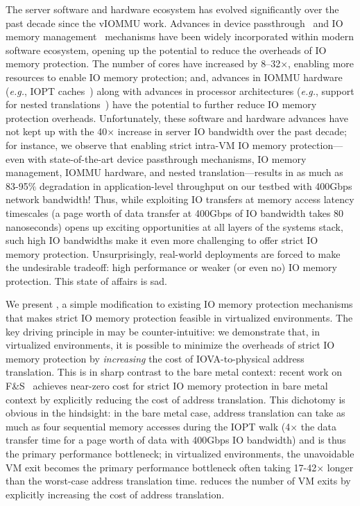 The server software and hardware ecosystem has evolved significantly over the past decade since the vIOMMU work. 
Advances in device passthrough~\cite{intel_vtd_spec, amd_iommu_spec, arm_smmu_spec, Wang2025ToPRI, Guo2024VPRI} 
    and IO memory management~\cite{markuze2018damn} mechanisms have been widely incorporated within modern software ecosystem, 
    opening up the potential to reduce the overheads of IO memory protection. 
The number of cores have increased by 8--32$\times$, 
    enabling more resources to enable IO memory protection; 
    and, advances in IOMMU hardware (\textit{e.g.}, IOPT caches~\cite{Rubin2024FastSafe}) 
    along with advances in processor architectures (\textit{e.g.}, 
    support for nested translations~\cite{intel_vtd_spec}) have the potential to further reduce IO memory protection overheads. 
Unfortunately, these software and hardware advances have not kept up with the 40$\times$ 
    increase in server IO bandwidth over the past decade; 
    for instance, we observe that enabling strict intra-VM IO memory protection---even with state-of-the-art device passthrough 
    mechanisms, IO memory management, IOMMU hardware, and nested translation---results in 
    as much as 83-95$\%$ degradation in application-level throughput 
    on our testbed with 400Gbps network bandwidth! 
Thus, while exploiting IO transfers at memory access latency timescales 
    (a page worth of data transfer at 400Gbps of IO bandwidth takes 80 nanoseconds) 
    opens up exciting opportunities at all layers of the systems stack, 
    such high IO bandwidths make it even more challenging to offer strict IO memory protection. 
Unsurprisingly, real-world deployments are forced to make the undesirable tradeoff: 
    high performance or weaker (or even no) IO memory protection. This state of affairs is sad. 

We present {\name}, a simple modification to existing IO memory protection mechanisms 
    that makes strict IO memory protection feasible in virtualized environments. 
The key driving principle in {\name} may be counter-intuitive: 
    we demonstrate that, in virtualized environments, it is possible to minimize the overheads 
    of strict IO memory protection by \textit{increasing} the cost of IOVA-to-physical address translation. 
    This is in sharp contrast to the bare metal context: recent work on F\&S~\cite{Rubin2024FastSafe} 
    achieves near-zero cost for strict IO memory protection in bare metal context by explicitly 
    reducing the cost of address translation. 
This dichotomy is obvious in the hindsight: in the bare metal case, address translation 
    can take as much as four sequential memory accesses during the IOPT walk (4$\times$ the data transfer 
    time for a page worth of data with 400Gbps IO bandwidth) 
    and is thus the primary performance bottleneck; in virtualized environments, 
    the unavoidable VM exit becomes the primary performance bottleneck often taking 17-42$\times$ 
    longer than the worst-case address translation time. 
{\name} reduces the number of VM exits by explicitly increasing the cost of address translation. 

